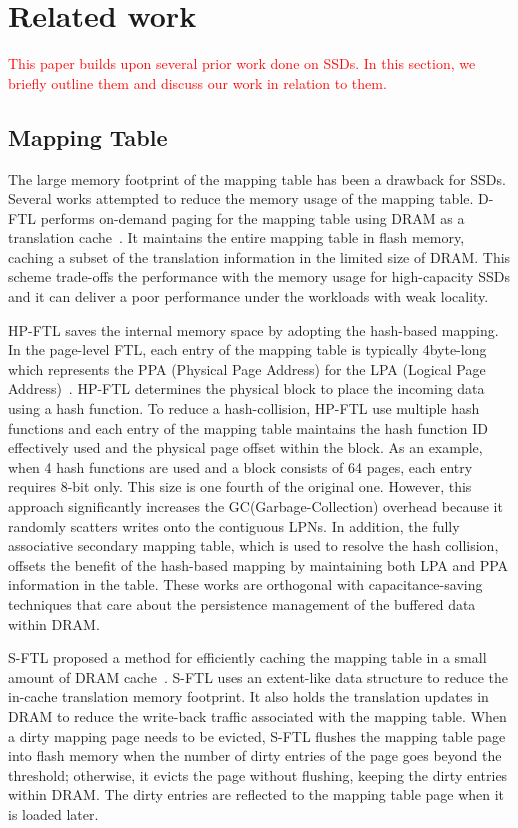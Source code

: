 \section{Related work}

\textcolor{red}{This paper builds upon several prior work done on SSDs. In this section, we briefly outline them and discuss our work in relation to them.}

\subsection{Mapping Table}
The large memory footprint of the mapping table has been a drawback for SSDs.
Several works attempted to reduce the memory usage of the mapping table. 
D-FTL performs on-demand paging for the mapping table using DRAM as a translation cache~\cite{gupta2009dftl}.
It maintains the entire mapping table in flash memory, caching a subset of the translation information in the limited size of DRAM.
This scheme trade-offs the performance with the memory usage for high-capacity SSDs and it can deliver a poor performance under the workloads with weak locality. 

HP-FTL saves the internal memory space by adopting the hash-based mapping. In the page-level FTL, each entry of the mapping table is typically 4byte-long which represents the PPA (Physical Page Address) for the LPA (Logical Page Address)~\cite{ni2017hash}. 
HP-FTL determines the physical block to place the incoming data using a hash function. To reduce a hash-collision, HP-FTL use multiple hash functions and each entry of the mapping table maintains the hash function ID effectively used and the physical page offset within the block. As an example, when 4 hash functions are used and a block consists of 64 pages, each entry requires 8-bit only. This size is one fourth of the original one. However, this approach significantly increases the GC(Garbage-Collection) overhead because it randomly scatters writes onto the contiguous LPNs. 
In addition, the fully associative secondary mapping table, which is used to resolve the hash collision, offsets the benefit of the hash-based mapping by maintaining both LPA and PPA information in the table. 
These works are orthogonal with capacitance-saving techniques that care about the persistence management of the buffered data within DRAM.

S-FTL proposed a method for efficiently caching the mapping table in a small amount of DRAM cache~\cite{jiang2011s}. S-FTL uses an extent-like data structure to reduce the in-cache translation memory footprint. It also holds the translation updates in DRAM to reduce the write-back traffic associated with the mapping table. When a dirty mapping page needs to be evicted, S-FTL flushes the mapping table page into flash memory when the number of dirty entries of the page goes beyond the threshold; otherwise, it evicts the page without flushing, keeping the dirty entries within DRAM. The dirty entries are reflected to the mapping table page when it is loaded later. 

